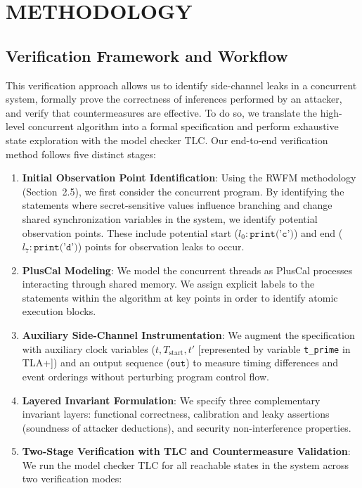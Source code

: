 \documentclass[a4paper,12pt]{report}
\begin{document}
\chapter{METHODOLOGY}

\section{Verification Framework and Workflow}
This verification approach allows us to identify side-channel leaks in a concurrent system, formally prove the correctness of inferences performed by an attacker, and verify that countermeasures are effective. To do so, we translate the high-level concurrent algorithm into a formal specification and perform exhaustive state exploration with the model checker TLC. Our end-to-end verification method follows five distinct stages:
\begin{enumerate}[label=\textbf{Stage \arabic*:}, leftmargin=1.9cm, itemsep=0.2em, topsep=0.15em]
    \item \textbf{Initial Observation Point Identification}: Using the RWFM methodology (Section~2.5), we first consider the concurrent program. By identifying the statements where secret-sensitive values influence branching and change shared synchronization variables in the system, we identify potential observation points. These include potential start ($l_0: \texttt{print('c')}$) and end ($l_7: \texttt{print('d')}$) points for observation leaks to occur.
    \item \textbf{PlusCal Modeling}: We model the concurrent threads as PlusCal processes interacting through shared memory. We assign explicit labels to the statements within the algorithm at key points in order to identify atomic execution blocks.
    \item \textbf{Auxiliary Side-Channel Instrumentation}: We augment the specification with auxiliary clock variables ($t, T_{\text{start}}, t'$ [represented by variable \texttt{t\_prime} in TLA+]) and an output sequence ($\texttt{out}$) to measure timing differences and event orderings without perturbing program control flow.
    \item \textbf{Layered Invariant Formulation}: We specify three complementary invariant layers: functional correctness, calibration and leaky assertions (soundness of attacker deductions), and security non-interference properties.
    \item \textbf{Two-Stage Verification with TLC and Countermeasure Validation}: We run the model checker TLC for all reachable states in the system across two verification modes:

\end{enumerate}
\end{document}
